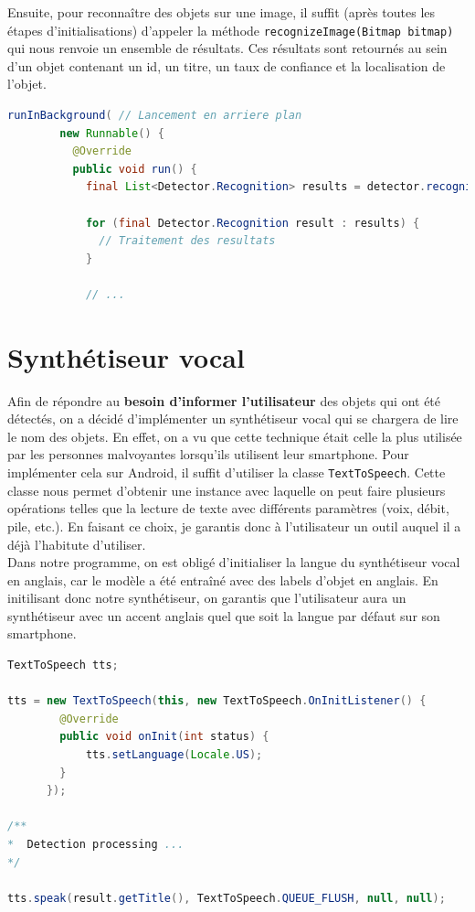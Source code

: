 \documentclass[UTF8]{EPURapport}
\begin{document}
Ensuite, pour reconnaître des objets sur une image, il suffit (après toutes les étapes d'initialisations) d'appeler la méthode \verb|recognizeImage(Bitmap bitmap)| qui nous renvoie un ensemble de résultats. Ces résultats sont retournés au sein d'un objet contenant un id, un titre, un taux de confiance et la localisation de l'objet.\\

\begin{lstlisting}[language=Java]
 runInBackground( // Lancement en arriere plan
        new Runnable() {
          @Override
          public void run() {
            final List<Detector.Recognition> results = detector.recognizeImage(croppedBitmap); // Traitement

        	for (final Detector.Recognition result : results) {
              // Traitement des resultats
            }

        	// ...
\end{lstlisting}

\section{Synthétiseur vocal}

Afin de répondre au \textbf{besoin d'informer l'utilisateur} des objets qui ont été détectés, on a décidé d'implémenter un synthétiseur vocal qui se chargera de lire le nom des objets. En effet, on a vu que cette technique était celle la plus utilisée par les personnes malvoyantes lorsqu'ils utilisent leur smartphone. Pour implémenter cela sur Android, il suffit d'utiliser la classe \verb|TextToSpeech|. Cette classe nous permet d'obtenir une instance avec laquelle on peut faire plusieurs opérations telles que la lecture de texte avec différents paramètres (voix, débit, pile, etc.). En faisant ce choix, je garantis donc à l'utilisateur un outil auquel il a déjà l'habitute d'utiliser. \\

Dans notre programme, on est obligé d'initialiser la langue du synthétiseur vocal en anglais, car le modèle a été entraîné avec des labels d'objet en anglais. En initilisant donc notre synthétiseur, on garantis que l'utilisateur aura un synthétiseur avec un accent anglais quel que soit la langue par défaut sur son smartphone. \\

\begin{lstlisting}[language=Java]
TextToSpeech tts;

tts = new TextToSpeech(this, new TextToSpeech.OnInitListener() {
        @Override
        public void onInit(int status) {
      		tts.setLanguage(Locale.US);
        }
      });

/**
*  Detection processing ...
*/

tts.speak(result.getTitle(), TextToSpeech.QUEUE_FLUSH, null, null);
\end{lstlisting}
\end{document}
